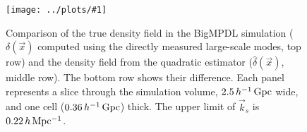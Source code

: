 \documentclass[prd,amsmath,amssymb,floatfix,superscriptaddress,nofootinbib,twocolumn]{revtex4-1}
\newcommand{\vk}{\vec{k}}
\newcommand{\sfigg}[2]{
\texttt{[image: ../plots/\#1]}
        }
\newcommand{\Sfigg}[2]{
   \begin{figure}[thbp]
    \sfigg{../plots/#1.pdf}{.8\paperwidth}
    \caption{{\small #2}}
    \label{fig:#1}
   \end{figure}
}
\begin{document}
\onecolumngrid
\Sfigg{real1}{Comparison of the true density field in the BigMPDL simulation ($\delta(\vec{x})$ computed using the directly measured large-scale modes, top row) and the density field from the quadratic estimator ($\hat{\delta}(\vec{x})$, middle row). The bottom row shows their difference. Each panel represents a slice through the simulation volume,  $2.5 \,h^{-1}\,\rm Gpc$ wide, and one cell ($0.36 \,h^{-1}\,\rm Gpc$) thick.  The upper limit of $\vk_s$ is $0.22 \,h\, \rm Mpc^{-1}$.}
\twocolumngrid


\end{document}
